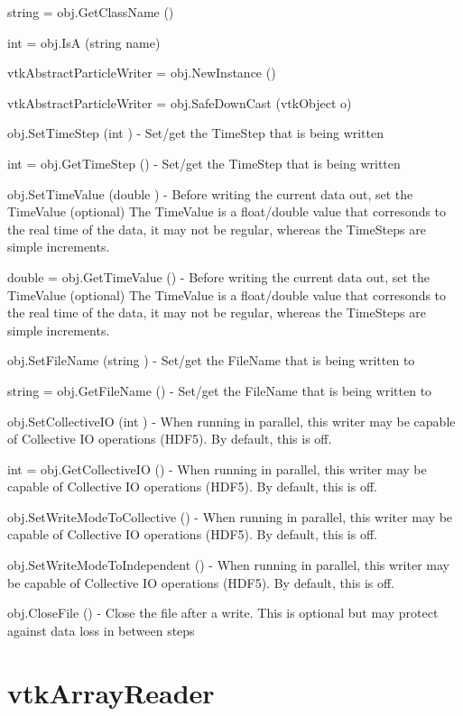 \begin{DoxyItemize}
\item {\ttfamily string = obj.\-Get\-Class\-Name ()}  
\item {\ttfamily int = obj.\-Is\-A (string name)}  
\item {\ttfamily vtk\-Abstract\-Particle\-Writer = obj.\-New\-Instance ()}  
\item {\ttfamily vtk\-Abstract\-Particle\-Writer = obj.\-Safe\-Down\-Cast (vtk\-Object o)}  
\item {\ttfamily obj.\-Set\-Time\-Step (int )} -\/ Set/get the Time\-Step that is being written  
\item {\ttfamily int = obj.\-Get\-Time\-Step ()} -\/ Set/get the Time\-Step that is being written  
\item {\ttfamily obj.\-Set\-Time\-Value (double )} -\/ Before writing the current data out, set the Time\-Value (optional) The Time\-Value is a float/double value that corresonds to the real time of the data, it may not be regular, whereas the Time\-Steps are simple increments.  
\item {\ttfamily double = obj.\-Get\-Time\-Value ()} -\/ Before writing the current data out, set the Time\-Value (optional) The Time\-Value is a float/double value that corresonds to the real time of the data, it may not be regular, whereas the Time\-Steps are simple increments.  
\item {\ttfamily obj.\-Set\-File\-Name (string )} -\/ Set/get the File\-Name that is being written to  
\item {\ttfamily string = obj.\-Get\-File\-Name ()} -\/ Set/get the File\-Name that is being written to  
\item {\ttfamily obj.\-Set\-Collective\-I\-O (int )} -\/ When running in parallel, this writer may be capable of Collective I\-O operations (H\-D\-F5). By default, this is off.  
\item {\ttfamily int = obj.\-Get\-Collective\-I\-O ()} -\/ When running in parallel, this writer may be capable of Collective I\-O operations (H\-D\-F5). By default, this is off.  
\item {\ttfamily obj.\-Set\-Write\-Mode\-To\-Collective ()} -\/ When running in parallel, this writer may be capable of Collective I\-O operations (H\-D\-F5). By default, this is off.  
\item {\ttfamily obj.\-Set\-Write\-Mode\-To\-Independent ()} -\/ When running in parallel, this writer may be capable of Collective I\-O operations (H\-D\-F5). By default, this is off.  
\item {\ttfamily obj.\-Close\-File ()} -\/ Close the file after a write. This is optional but may protect against data loss in between steps  
\end{DoxyItemize}\hypertarget{vtkio_vtkarrayreader}{}\section{vtk\-Array\-Reader}\label{vtkio_vtkarrayreader}
